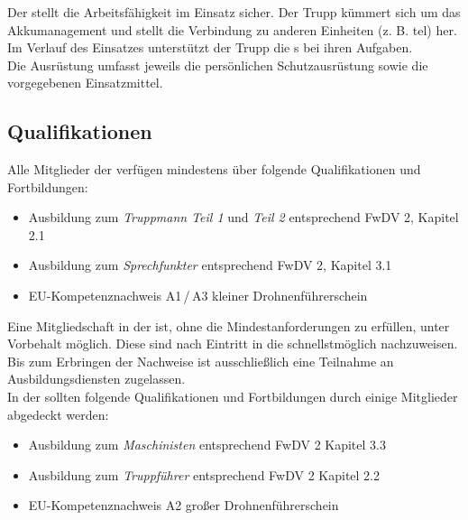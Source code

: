 \subsubsection{\schlauchtrupp}

Der \schlauchtrupp{} stellt die Arbeitsfähigkeit im Einsatz sicher. Der Trupp kümmert sich um das Akkumanagement und stellt die Verbindung zu anderen Einheiten (z. B. \ac{tel}) her. Im Verlauf des Einsatzes unterstützt der Trupp die \robotiktrupp{}s bei ihren Aufgaben.\\

\noindent Die Ausrüstung umfasst jeweils die persönlichen Schutzausrüstung sowie die vorgegebenen Einsatzmittel.

\subsection{Qualifikationen}
\label{sec:qualifikationen}

Alle Mitglieder der \callee{} verfügen mindestens über folgende Qualifikationen und Fortbildungen:

\begin{itemize}
 \item Ausbildung zum \textit{Truppmann Teil 1} und \textit{Teil 2} entsprechend FwDV 2, Kapitel 2.1
 \item Ausbildung zum \textit{Sprechfunkter} entsprechend FwDV 2, Kapitel 3.1
 \item EU-Kompetenznachweis A1\,/\,A3 \flq kleiner Drohnenführerschein\frq{}
\end{itemize}

\noindent Eine Mitgliedschaft in der \callee{} ist, ohne die Mindestanforderungen zu erfüllen, unter Vorbehalt möglich. Diese sind nach Eintritt in die \callee{} schnellstmöglich nachzuweisen. Bis zum Erbringen der Nachweise ist ausschließlich eine Teilnahme an Ausbildungsdiensten zugelassen.\\

\noindent In der \callee{} sollten folgende Qualifikationen und Fortbildungen durch einige Mitglieder abgedeckt werden:

\begin{itemize}
 \item Ausbildung zum \textit{Maschinisten} entsprechend FwDV 2 Kapitel 3.3
 \item Ausbildung zum \textit{Truppführer} entsprechend FwDV 2 Kapitel 2.2
 \item EU-Kompetenznachweis A2 \flq großer Drohnenführerschein\frq{}
\end{itemize}

